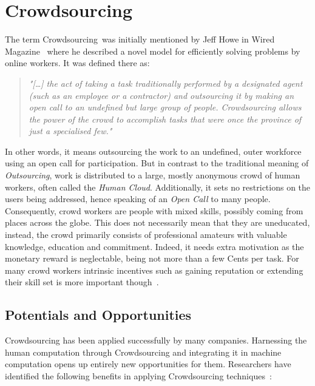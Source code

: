 
\section{Crowdsourcing}\label{sec:state_of_the_art_crowdsourcing}
The term \guillemotright Crowdsourcing\guillemotleft~was initially mentioned by Jeff Howe in Wired Magazine~\cite{howe2006} where he described a novel model for efficiently solving problems by online workers. It was defined there as:
\begin{quotation}
	\textit{"[\ldots] the act of taking a task traditionally performed by a designated agent (such as an employee or a contractor) and outsourcing it by making an open call to an undefined but large group of people.  Crowdsourcing allows the power of the crowd to accomplish tasks that were once the province of just a specialised few."}\cite{howe2008}
\end{quotation}
In other words, it means outsourcing the work to an undefined, outer workforce using an open call for participation. But in contrast to the traditional meaning of \emph{Outsourcing}, work is distributed to a large, mostly anonymous crowd of human workers, often called the \emph{Human Cloud}. Additionally, it sets no restrictions on the users being addressed, hence speaking of an \emph{Open Call} to many people. Consequently, crowd workers are people with mixed skills, possibly coming from places across the globe. This does not necessarily mean that they are uneducated, instead, the crowd primarily consists of professional amateurs with valuable knowledge, education and commitment. Indeed, it needs extra motivation as the monetary reward is neglectable, being not more than a few Cents per task. For many crowd workers intrinsic incentives such as gaining reputation or extending their skill set is more important though~\cite{kaufmann2018}. 

\subsection{Potentials and Opportunities}
Crowdsourcing has been applied successfully by many companies. Harnessing the human computation through Crowdsourcing and integrating it in machine computation opens up entirely new opportunities for them. Researchers have identified the following benefits in applying Crowdsourcing techniques~\cite{schenk2012}:

